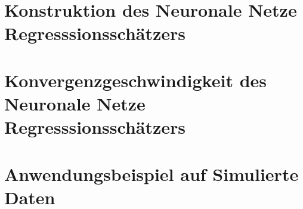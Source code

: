 \documentclass[12pt,a4paper,twoside]{report}
\begin{document}
\pagestyle{empty}


\cleardoublepage 


\cleardoublepage
\tableofcontents

\pagestyle{headings}



\chapter{Konstruktion des Neuronale Netze Regresssionsschätzers}
%
\chapter{Konvergenzgeschwindigkeit des Neuronale Netze Regresssionsschätzers}
%
\chapter{Anwendungsbeispiel auf Simulierte Daten}
%





%
%
%
%
%
%
%


\end{document}
